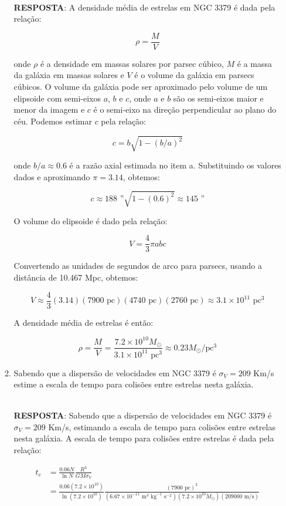 \documentclass[a4paper,12pt]{article}
\begin{document}
\begin{enumerate}
\begin{enumerate}
\noindent\hrulefill\\\textbf{RESPOSTA}: A densidade média de estrelas em NGC 3379 é dada pela relação:

$$\rho = \frac{M}{V}$$

onde $\rho$ é a densidade em massas solares por parsec cúbico, $M$ é a massa da galáxia em massas solares e $V$ é o volume da galáxia em parsecs cúbicos. O volume da galáxia pode ser aproximado pelo volume de um elipsoide com semi-eixos $a$, $b$ e $c$, onde $a$ e $b$ são os semi-eixos maior e menor da imagem e $c$ é o semi-eixo na direção perpendicular ao plano do céu. Podemos estimar $c$ pela relação:

$$c = b \sqrt{1 - (b/a)^2}$$

onde $b/a \approx 0.6$ é a razão axial estimada no item a. Substituindo os valores dados e aproximando $\pi = 3.14$, obtemos:

$$c \approx 188 \text{ ”} \sqrt{1 - (0.6)^2} \approx 145 \text{ ”}$$

O volume do elipsoide é dado pela relação:

$$V = \frac{4}{3} \pi abc$$

Convertendo as unidades de segundos de arco para parsecs, usando a distância de 10.467 Mpc, obtemos:

$$V \approx \frac{4}{3} (3.14) (7900 \text{ pc}) (4740 \text{ pc}) (2760 \text{ pc}) \approx 3.1 \times 10^{11} \text{ pc}^3$$

A densidade média de estrelas é então:

$$\rho = \frac{M}{V} = \frac{7.2 \times 10^{10} M_\odot}{3.1 \times 10^{11} \text{ pc}^3} \approx 0.23 M_\odot/\text{pc}^3$$

\noindent\hrulefill

\item Sabendo que a dispersão de velocidades em NGC 3379 é $\sigma_V=209$ Km/s estime a escala de tempo para colisões entre estrelas nesta galáxia.

\noindent\hrulefill\\\textbf{RESPOSTA}: Sabendo que a dispersão de velocidades em NGC 3379 é $\sigma_V=209$ Km/s, estimando a escala de tempo para colisões entre estrelas nesta galáxia. A escala de tempo para colisões entre estrelas é dada pela relação:

\begin{align*}
t_c &= \frac{0.06 N}{\ln N} \frac{R^3}{GM \sigma_V} \\
&= \frac{0.06 (7.2 \times 10^{10})}{\ln (7.2 \times 10^{10})} \frac{(7900 \text{ pc})^3}{(6.67 \times 10^{-11} \text{ m}^3 \text{ kg}^{-1} \text{ s}^{-2})(7.2 \times 10^{10} M_\odot)(209000 \text{ m/s})}
\end{align*}


\end{enumerate}
\end{enumerate}
\end{document}
